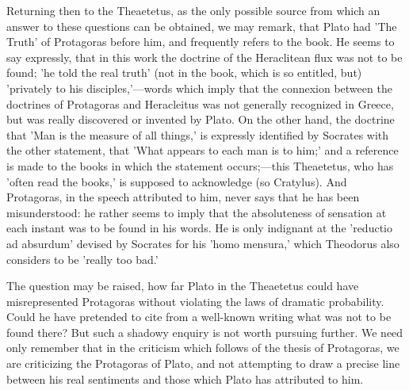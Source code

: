 \documentclass[11pt,letter]{article}
\begin{document}
\par  Returning then to the Theaetetus, as the only possible source from which an answer to these questions can be obtained, we may remark, that Plato had 'The Truth' of Protagoras before him, and frequently refers to the book. He seems to say expressly, that in this work the doctrine of the Heraclitean flux was not to be found; 'he told the real truth' (not in the book, which is so entitled, but) 'privately to his disciples,'—words which imply that the connexion between the doctrines of Protagoras and Heracleitus was not generally recognized in Greece, but was really discovered or invented by Plato. On the other hand, the doctrine that 'Man is the measure of all things,' is expressly identified by Socrates with the other statement, that 'What appears to each man is to him;' and a reference is made to the books in which the statement occurs;—this Theaetetus, who has 'often read the books,' is supposed to acknowledge (so Cratylus). And Protagoras, in the speech attributed to him, never says that he has been misunderstood: he rather seems to imply that the absoluteness of sensation at each instant was to be found in his words. He is only indignant at the 'reductio ad absurdum' devised by Socrates for his 'homo mensura,' which Theodorus also considers to be 'really too bad.'

\par  The question may be raised, how far Plato in the Theaetetus could have misrepresented Protagoras without violating the laws of dramatic probability. Could he have pretended to cite from a well-known writing what was not to be found there? But such a shadowy enquiry is not worth pursuing further. We need only remember that in the criticism which follows of the thesis of Protagoras, we are criticizing the Protagoras of Plato, and not attempting to draw a precise line between his real sentiments and those which Plato has attributed to him.
\end{document}
